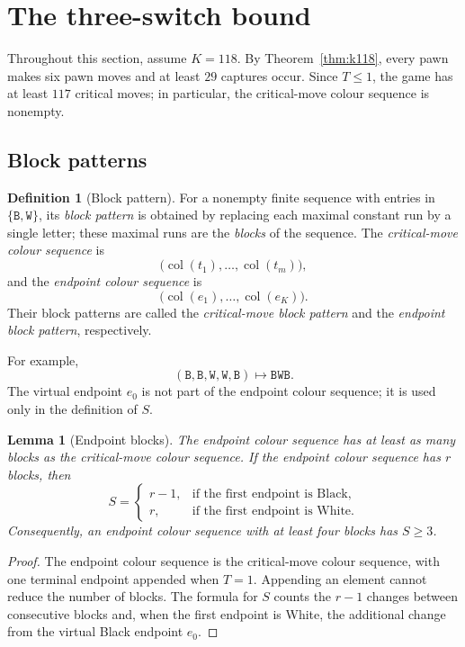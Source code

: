 \documentclass[11pt]{article}
\newtheorem{lemma}[theorem]{Lemma}
\theoremstyle{definition}
\newtheorem{definition}[theorem]{Definition}
\newcommand{\B}{\mathtt{B}}
\newcommand{\W}{\mathtt{W}}
\begin{document}
\section{The three-switch bound}\label{sec:switches}

Throughout this section, assume $K=118$. By Theorem~\ref{thm:k118}, every
pawn makes six pawn moves and at least $29$ captures occur. Since $T\le1$, the
game has at least $117$ critical moves; in particular, the critical-move
colour sequence is nonempty.

\subsection{Block patterns}

\begin{definition}[Block pattern]\label{def:pattern}
For a nonempty finite sequence with entries in $\{\B,\W\}$, its \emph{block
pattern} is obtained by replacing each maximal constant run by a single
letter; these maximal runs are the \emph{blocks} of the sequence. The
\emph{critical-move colour sequence} is
\[
  \bigl(\operatorname{col}(t_1),\ldots,
        \operatorname{col}(t_m)\bigr),
\]
and the \emph{endpoint colour sequence} is
\[
  \bigl(\operatorname{col}(e_1),\ldots,
        \operatorname{col}(e_K)\bigr).
\]
Their block patterns are called the \emph{critical-move block pattern} and the
\emph{endpoint block pattern}, respectively.
\end{definition}

For example,
\[
  (\B,\B,\W,\W,\B)\longmapsto\B\W\B.
\]
The virtual endpoint $e_0$ is not part of the endpoint colour sequence; it is
used only in the definition of $S$.

\begin{lemma}[Endpoint blocks]\label{lem:blockrelation}
The endpoint colour sequence has at least as many blocks as the critical-move
colour sequence. If the endpoint colour sequence has $r$ blocks, then
\[
  S=
  \begin{cases}
    r-1,&\text{if the first endpoint is Black},\\
    r,&\text{if the first endpoint is White}.
  \end{cases}
\]
Consequently, an endpoint colour sequence with at least four blocks has
$S\ge3$.
\end{lemma}

\begin{proof}
The endpoint colour sequence is the critical-move colour sequence, with one
terminal endpoint appended when $T=1$. Appending an element cannot reduce the
number of blocks. The formula for $S$ counts the $r-1$ changes between
consecutive blocks and, when the first endpoint is White, the additional
change from the virtual Black endpoint $e_0$.
\end{proof}
\end{document}
